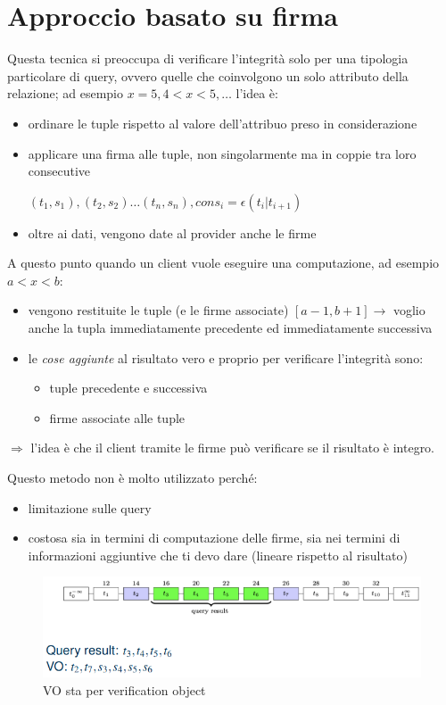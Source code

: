\documentclass{report}
\begin{document}
\section{Approccio basato su firma}

Questa tecnica si preoccupa di verificare l'integrità solo per una tipologia
particolare di query, ovvero quelle che coinvolgono un solo attributo 
della relazione; ad esempio $x=5, 4<x<5,\dots$ l'idea è:
\begin{itemize}
    \item ordinare le tuple rispetto al valore dell'attribuo preso in considerazione 
    \item applicare una firma alle tuple, non singolarmente ma in coppie tra loro consecutive 
    
    $(t_1,s_1),(t_2,s_2)\dots(t_n,s_n), con s_i = \epsilon(t_i | t_{i+1})$ 
    \item oltre ai dati, vengono date al provider anche le firme
\end{itemize}

\noindent A questo punto quando un client vuole eseguire una computazione, ad esempio 
$a<x<b$:
\begin{itemize}
    \item vengono restituite le tuple (e le firme associate) $[a-1,b+1] \rightarrow$ voglio anche la tupla 
    immediatamente precedente ed immediatamente successiva 
    \item le \textit{cose aggiunte} al risultato vero e proprio per verificare l'integrità sono: 
    \begin{itemize}
        \item tuple precedente e successiva 
        \item firme associate alle tuple 
    \end{itemize}
\end{itemize} 

\noindent $\Rightarrow$ l'idea è che il client tramite le firme può verificare se il risultato è integro.

\noindent Questo metodo non è molto utilizzato perché:
\begin{itemize}
    \item limitazione sulle query
    \item costosa sia in termini di computazione delle firme, sia nei termini di informazioni 
    aggiuntive che ti devo dare (lineare rispetto al risultato)
\end{itemize}

\begin{figure}[H]
    \centering
    \includegraphics[width=1\linewidth]{images/signature.png}
    \caption{VO sta per verification object}
\end{figure}
\end{document}
